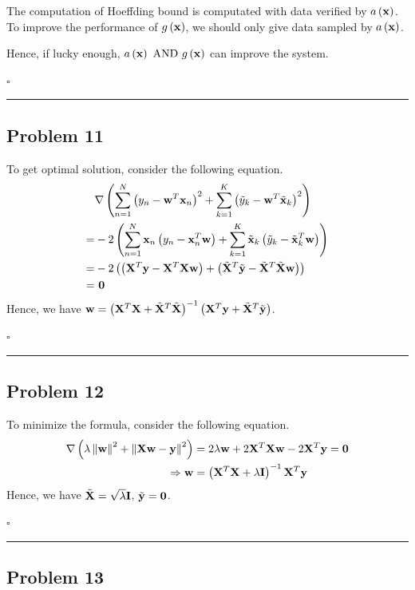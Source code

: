 \documentclass[12pt]{article}
\newcommand*{\QEDB}{\hfill\ensuremath{\square}}
\newcommand{\ParTh}[1]{\left(#1\right)}
\newcommand{\BF}[1]{{\bf#1}}
\newcommand{\VecAbsVal}[1]{\left\|#1\right\|}
\newcommand{\horrule}[1]{\rule{\linewidth}{#1}}
\begin{document}
The computation of Hoeffding bound is computated with data verified by $a\ParTh{\BF{x}}$. To improve the performance of $g\ParTh{\BF{x}}$, we should only give data sampled by $a\ParTh{\BF{x}}$.

Hence, if lucky enough, $a\ParTh{\BF{x}}\text{ AND }g\ParTh{\BF{x}}$ can improve the system.

\QEDB

\horrule{0.5pt}

\subsection*{Problem 11}

To get optimal solution, consider the following equation.
\begin{align}
&\nabla\ParTh{\sum_{n=1}^{N}\ParTh{y_n-\BF{w}^T\BF{x}_n}^2+\sum_{k=1}^{K}\ParTh{\tilde{y}_k-\BF{w}^T\tilde{\BF{x}}_k}^2}\\
=&-2\ParTh{\sum_{n=1}^{N}\BF{x}_n\ParTh{y_n-\BF{x}^T_n\BF{w}}+\sum_{k=1}^{K}\tilde{\BF{x}}_k\ParTh{\tilde{y}_k-\tilde{\BF{x}}^T_k\BF{w}}}\\
=&-2\ParTh{\ParTh{\BF{X}^T\BF{y}-\BF{X}^T\BF{X}\BF{w}}+\ParTh{\tilde{\BF{X}}^T\tilde{\BF{y}}-\tilde{\BF{X}}^T\tilde{\BF{X}}\BF{w}}}\\
=&~\BF{0}
\end{align}
Hence, we have $\BF{w}=\ParTh{\BF{X}^T\BF{X}+\tilde{\BF{X}}^T\tilde{\BF{X}}}^{-1}\ParTh{\BF{X}^T\BF{y}+\tilde{\BF{X}}^T\tilde{\BF{y}}}$.

\QEDB

\horrule{0.5pt}

\subsection*{Problem 12}

To minimize the formula, consider the following equation.
\begin{align}
\nabla\ParTh{\lambda\VecAbsVal{\BF{w}}^2+\VecAbsVal{\BF{X}\BF{w}-\BF{y}}^2}&=2\lambda\BF{w}+2\BF{X}^T\BF{X}\BF{w}-2\BF{X}^T\BF{y}=\BF{0}\\
\Rightarrow\BF{w}&=\ParTh{\BF{X}^T\BF{X}+\lambda\BF{I}}^{-1}\BF{X}^T\BF{y}
\end{align}
Hence, we have $\tilde{\BF{X}}=\sqrt{\lambda}\BF{I}$, $\tilde{\BF{y}}=\BF{0}$.

\QEDB

\horrule{0.5pt}

\subsection*{Problem 13}
\end{document}
